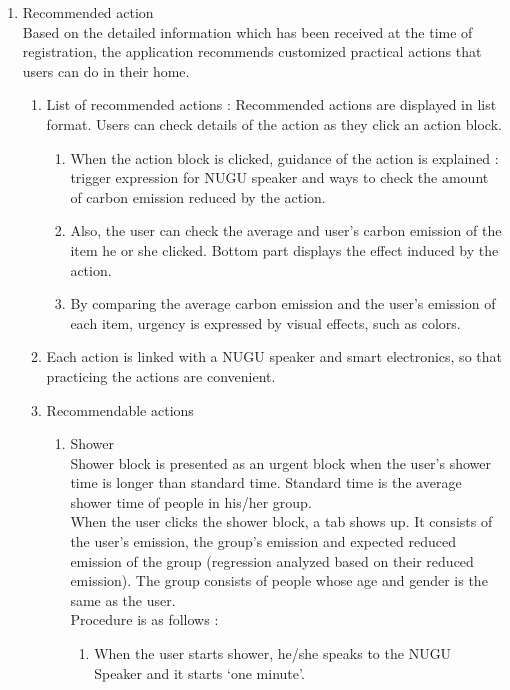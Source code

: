 \documentclass[11pt, conference]{IEEEtran}
\begin{document}
\begin{enumerate}[label=\arabic*]
    \item {\large{Recommended action}}\\
    Based on the detailed information which has been received at the time of registration, the application recommends customized practical actions that users can do in their home.
    \begin{enumerate}[label=\alph*]
        \item List of recommended actions : Recommended actions are displayed in list format. Users can check details of the action as they click an action block.
        \begin{enumerate}
            \item When the action block is clicked, guidance of the action is explained : trigger expression for NUGU speaker and ways to check the amount of carbon emission reduced by the action.
            \item Also, the user can check the average and user’s carbon emission of the item he or she clicked. Bottom part displays the effect induced by the action.
            \item By comparing the average carbon emission and the user’s emission of each item, urgency is expressed by visual effects, such as colors.
        \end{enumerate}
        \item Each action is linked with a NUGU speaker and smart electronics, so that practicing the actions are convenient.
        \item Recommendable actions
        \begin{enumerate}
            \item Shower\\
            Shower block is presented as an urgent block when the user’s shower time is longer than standard time. Standard time is the average shower time of people in his/her group.\\
            When the user clicks the shower block, a tab shows up. It consists of the user’s emission, the group’s emission and expected reduced emission of the group (regression analyzed based on their reduced emission). The group consists of people whose age and gender is the same as the user.\\
            Procedure is as follows :
            \begin{enumerate}[label=\arabic*]
                \item When the user starts shower, he/she speaks to the NUGU Speaker and it starts ‘one minute’.

\end{enumerate}
\end{enumerate}
\end{enumerate}
\end{enumerate}
\end{document}
